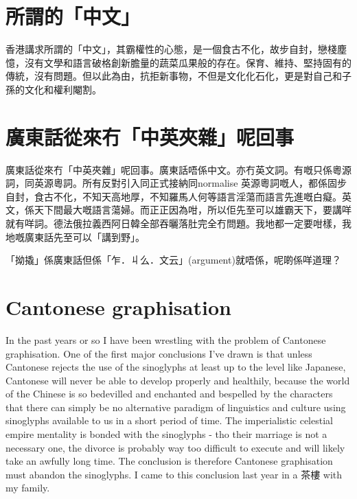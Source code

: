 \section{所謂的「中文」}

香港講求所謂的「中文」，其霸權性的心態，是一個食古不化，故步自封，戀棧塵憶，沒有文學和語言破格創新膽量的蔬菜瓜果般的存在。保育、維持、堅持固有的傳統，沒有問題。但以此為由，抗拒新事物，不但是文化化石化，更是對自己和子孫的文化和權利閹割。


\section{廣東話從來冇「中英夾雜」呢回事}
廣東話從來冇「中英夾雜」呢回事。廣東話唔係中文。亦冇英文詞。有嘅只係粵源詞，同英源粵詞。所有反對引入同正式接納同normalise 英源粵詞嘅人，都係固步自封，食古不化，不知天高地厚，不知羅馬人何等語言淫蕩而語言先進嘅白癡。英文，係天下間最大嘅語言蕩婦。而正正因為咁，所以佢先至可以雄霸天下，要講咩就有咩詞。德法俄拉義西阿日韓全部吞曬落肚完全冇問題。我地都一定要咁樣，我地嘅廣東話先至可以「講到野」。


「拗撬」係廣東話但係「乍．丩么．文云」(argument)就唔係，呢啲係咩道理？


\section{Cantonese graphisation}
In the past years or so I have been wrestling with the problem of Cantonese graphisation. One of the first major conclusions I've drawn is that unless Cantonese rejects the use of the sinoglyphs at least up to the level like Japanese, Cantonese will never be able to develop properly and healthily, because the world of the Chinese is so bedevilled and enchanted and bespelled by the characters that there can simply be no alternative paradigm of linguistics and culture using sinoglyphs available to us in a short period of time. The imperialistic celestial empire mentality is bonded with the sinoglyphs - tho their marriage is not a necessary one, the divorce is probably way too difficult to execute and will likely take an awfully long time. The conclusion is therefore Cantonese graphisation must abandon the sinoglyphs. I came to this conclusion last year in a 茶樓 with my family.

